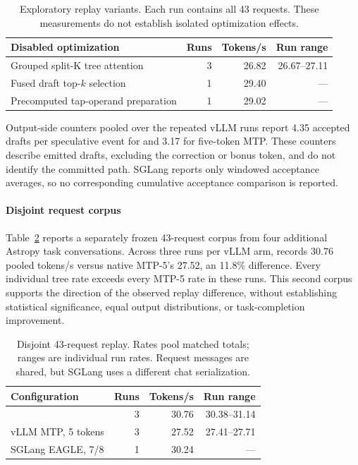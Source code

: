 \begin{table}[t]
\caption{Exploratory replay variants. Each run contains all 43 requests. These measurements do not establish isolated optimization effects.}
\label{tab:replay-variants}
\centering\small
\setlength{\tabcolsep}{3pt}
\begin{tabular}{@{}lrrr@{}}
\toprule
Disabled optimization & Runs & Tokens/s & Run range \\
\midrule
Grouped split-K tree attention & 3 & 26.82 & 26.67--27.11 \\
Fused draft top-$k$ selection & 1 & 29.40 & --- \\
Precomputed tap-operand preparation & 1 & 29.02 & --- \\
\bottomrule
\end{tabular}
\end{table}



Output-side counters pooled over the repeated vLLM runs report 4.35 accepted drafts per speculative event for \sys{} and 3.17 for five-token MTP. These counters describe emitted drafts, excluding the correction or bonus token, and do not identify the committed path. SGLang reports only windowed acceptance averages, so no corresponding cumulative acceptance comparison is reported.

\paragraph{Disjoint request corpus}
Table~\ref{tab:disjoint-replay} reports a separately frozen 43-request corpus from four additional Astropy task conversations. Across three runs per vLLM arm, \sys{} records 30.76 pooled tokens/s versus native MTP-5's 27.52, an 11.8\% difference. Every individual tree rate exceeds every MTP-5 rate in these runs. This second corpus supports the direction of the observed replay difference, without establishing statistical significance, equal output distributions, or task-completion improvement.

\begin{table}[t]
\caption{Disjoint 43-request replay. Rates pool matched totals; ranges are individual run rates. Request messages are shared, but SGLang uses a different chat serialization.}
\label{tab:disjoint-replay}
\centering\small
\begin{tabular}{@{}lrrr@{}}
\toprule
Configuration & Runs & Tokens/s & Run range \\
\midrule
\sys{} & 3 & 30.76 & 30.38--31.14 \\
vLLM MTP, 5 tokens & 3 & 27.52 & 27.41--27.71 \\
SGLang EAGLE, 7/8 & 1 & 30.24 & --- \\
\bottomrule
\end{tabular}
\end{table}

